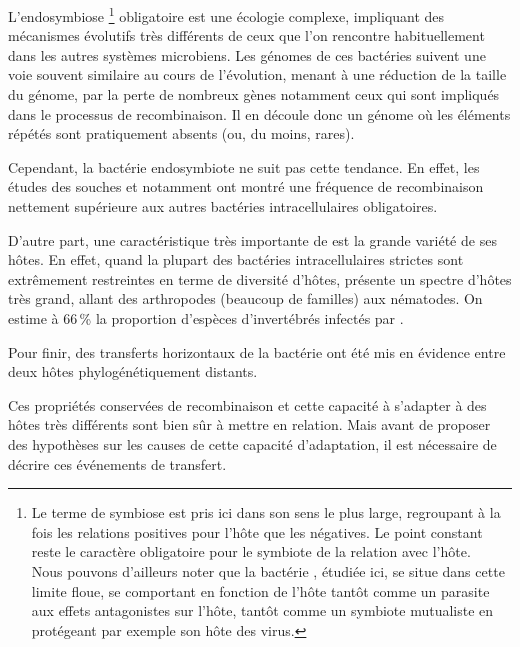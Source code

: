 L'endosymbiose%
\footnote{Le terme de symbiose est pris ici dans son sens le plus large,
regroupant à la fois les relations positives pour l'hôte que les négatives. Le
point constant reste le caractère obligatoire pour le symbiote de la relation
avec l'hôte.\\ Nous pouvons d'ailleurs noter que la bactérie ,
étudiée ici, se situe dans cette limite floue, se comportant en fonction de
l'hôte tantôt comme un parasite aux effets antagonistes sur
l'hôte\cite{Werren2008}, tantôt comme un symbiote mutualiste en protégeant par exemple
son hôte des virus.}
obligatoire est une écologie complexe, impliquant des mécanismes évolutifs
très différents de ceux que l'on rencontre habituellement dans les autres
systèmes microbiens. Les génomes de ces bactéries suivent une voie souvent
similaire au cours de l'évolution, menant à une réduction de la taille du
génome, par la perte de nombreux gènes\cite{wernegreen2002} notamment ceux qui
sont impliqués dans le processus de recombinaison. Il en découle donc un
génome où les éléments répétés sont pratiquement absents (ou, du moins,
rares\cite{Bordenstein2005}).

Cependant, la bactérie endosymbiote  ne suit pas cette
tendance. En effet, les études des souches  et  notamment
ont montré une fréquence de recombinaison nettement supérieure aux autres
bactéries intracellulaires obligatoires\cite{Wu2004}.

D'autre part, une caractéristique très importante de  est la
grande variété de ses hôtes.  En effet, quand la plupart des bactéries
intracellulaires strictes sont extrêmement restreintes en terme de diversité
d'hôtes,  présente un spectre d'hôtes très grand, allant des
arthropodes (beaucoup de familles) aux nématodes. On estime à 66\,\% la
proportion d'espèces d'invertébrés infectés par
\cite{hilgenboecker2008}.

Pour finir, des transferts horizontaux de la bactérie ont été mis en évidence
\cite{vavre1999} entre deux hôtes phylogénétiquement distants.

Ces propriétés conservées de recombinaison et cette capacité à s'adapter à des
hôtes très différents sont bien sûr à mettre en relation.
Mais avant de proposer des hypothèses sur les causes de cette capacité
d'adaptation, il est nécessaire de décrire ces événements de transfert.

